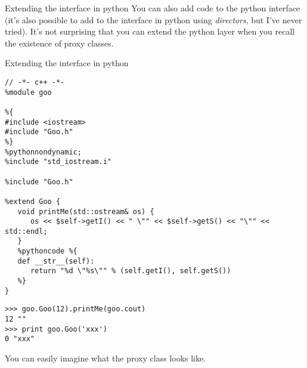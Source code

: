 \documentclass[10pt, t]{beamer}
\let\texttt=\graytt
\newcommand{\swig}{\texttt{swig}\xspace}  %
\begin{document}
%
%
%
%
%
%


\begin{frame}[label=sec-6-16]{Extending the interface in python}
You can also add code to the python interface (it's also possible to add to the \CPP interface in
python using \swig \emph{directors}, but I've never tried).  It's not surprising that you can extend the
python layer when you recall the existence of proxy classes.
\end{frame}

\begin{frame}[fragile,label=sec-6-17]{Extending the interface in python}
 \lstset{language=C,label= ,caption= ,numbers=none}
\begin{lstlisting}
// -*- c++ -*-
%module goo

%{
#include <iostream>
#include "Goo.h"
%}
%pythonnondynamic;
%include "std_iostream.i"

%include "Goo.h"

%extend Goo {
   void printMe(std::ostream& os) {
      os << $self->getI() << " \"" << $self->getS() << "\"" << std::endl;
   }
   %pythoncode %{
   def __str__(self):
      return "%d \"%s\"" % (self.getI(), self.getS())
   %}
}
\end{lstlisting}
\pause
\lstset{language=Python,label= ,caption= ,numbers=none}
\begin{lstlisting}
>>> goo.Goo(12).printMe(goo.cout)
12 ""
>>> print goo.Goo('xxx')
0 "xxx"
\end{lstlisting}
\pause
You can easily imagine what the proxy class looks like.
\end{frame}
\end{document}

